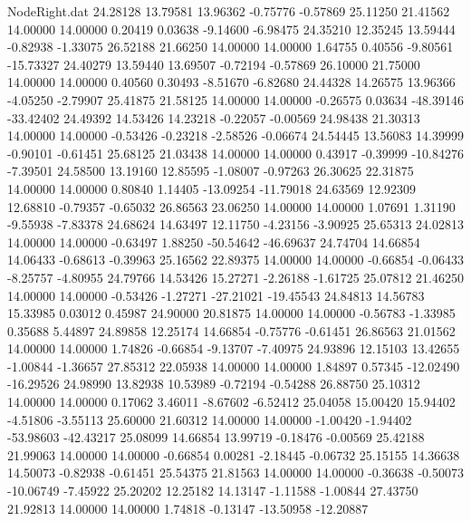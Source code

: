 \begin{filecontents}{NodeRight.dat}
  24.28128   13.79581   13.96362    -0.75776   -0.57869   25.11250   21.41562   14.00000   14.00000    0.20419    0.03638   -9.14600   -6.98475
  24.35210   12.35245   13.59444    -0.82938   -1.33075   26.52188   21.66250   14.00000   14.00000    1.64755    0.40556   -9.80561  -15.73327
  24.40279   13.59440   13.69507    -0.72194   -0.57869   26.10000   21.75000   14.00000   14.00000    0.40560    0.30493   -8.51670   -6.82680
  24.44328   14.26575   13.96366    -4.05250   -2.79907   25.41875   21.58125   14.00000   14.00000   -0.26575    0.03634  -48.39146  -33.42402
  24.49392   14.53426   14.23218    -0.22057   -0.00569   24.98438   21.30313   14.00000   14.00000   -0.53426   -0.23218   -2.58526   -0.06674
  24.54445   13.56083   14.39999    -0.90101   -0.61451   25.68125   21.03438   14.00000   14.00000    0.43917   -0.39999  -10.84276   -7.39501
  24.58500   13.19160   12.85595    -1.08007   -0.97263   26.30625   22.31875   14.00000   14.00000    0.80840    1.14405  -13.09254  -11.79018
  24.63569   12.92309   12.68810    -0.79357   -0.65032   26.86563   23.06250   14.00000   14.00000    1.07691    1.31190   -9.55938   -7.83378
  24.68624   14.63497   12.11750    -4.23156   -3.90925   25.65313   24.02813   14.00000   14.00000   -0.63497    1.88250  -50.54642  -46.69637
  24.74704   14.66854   14.06433    -0.68613   -0.39963   25.16562   22.89375   14.00000   14.00000   -0.66854   -0.06433   -8.25757   -4.80955
  24.79766   14.53426   15.27271    -2.26188   -1.61725   25.07812   21.46250   14.00000   14.00000   -0.53426   -1.27271  -27.21021  -19.45543
  24.84813   14.56783   15.33985     0.03012    0.45987   24.90000   20.81875   14.00000   14.00000   -0.56783   -1.33985    0.35688    5.44897
  24.89858   12.25174   14.66854    -0.75776   -0.61451   26.86563   21.01562   14.00000   14.00000    1.74826   -0.66854   -9.13707   -7.40975
  24.93896   12.15103   13.42655    -1.00844   -1.36657   27.85312   22.05938   14.00000   14.00000    1.84897    0.57345  -12.02490  -16.29526
  24.98990   13.82938   10.53989    -0.72194   -0.54288   26.88750   25.10312   14.00000   14.00000    0.17062    3.46011   -8.67602   -6.52412
  25.04058   15.00420   15.94402    -4.51806   -3.55113   25.60000   21.60312   14.00000   14.00000   -1.00420   -1.94402  -53.98603  -42.43217
  25.08099   14.66854   13.99719    -0.18476   -0.00569   25.42188   21.99063   14.00000   14.00000   -0.66854    0.00281   -2.18445   -0.06732
  25.15155   14.36638   14.50073    -0.82938   -0.61451   25.54375   21.81563   14.00000   14.00000   -0.36638   -0.50073  -10.06749   -7.45922
  25.20202   12.25182   14.13147    -1.11588   -1.00844   27.43750   21.92813   14.00000   14.00000    1.74818   -0.13147  -13.50958  -12.20887

\end{filecontents}
